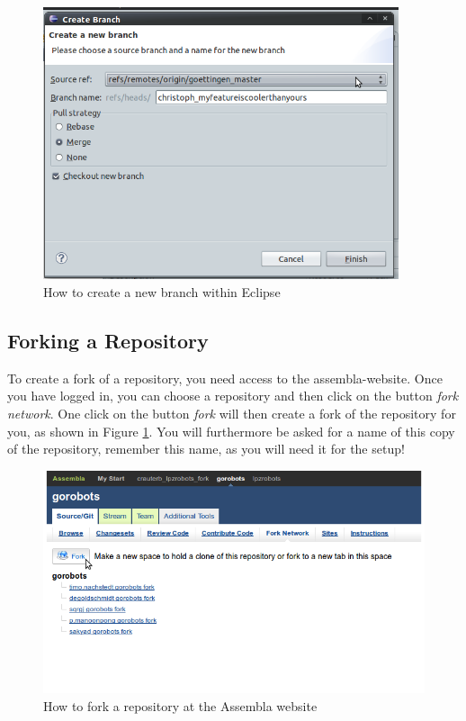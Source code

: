 \begin{figure}[h!]
 \begin{center}
 \includegraphics[height=8cm]{./pics/NewBranchSmall.png}
\end{center}
\caption{How to create a new branch within Eclipse}
\end{figure}



\newpage

\subsection{Forking a Repository}
\label{forksection}
To create a fork of a repository, you need access to the assembla-website. Once you have logged in, you can choose a repository and then click on the button \emph{fork network}.
One click on the button \emph{fork} will then create a fork of the repository for you, as shown in Figure \ref{fork}. You will furthermore be asked for a name of this copy of the repository, remember this name, as you will need it for the setup!

\begin{figure}[h!]
\begin{center}
\includegraphics[width=12cm]{./pics/Fork.png}
\caption{How to fork a repository at the Assembla website}
\label{fork}
\end{center}
\end{figure}


